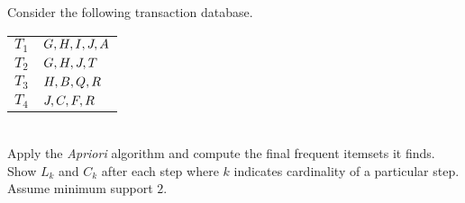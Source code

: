 



\question Consider the following transaction database.
\\
\begin{tabular}{ll}
  \textbf{$T_1$} & $G,H,I,J,A$ \nonumber \\
  \textbf{$T_2$} & $G,H,J,T$ \nonumber \\
  \textbf{$T_3$} & $H,B,Q,R$ \nonumber \\
  \textbf{$T_4$} & $J,C,F,R$ \nonumber
\end{tabular}
\\
Apply the \textit{Apriori} algorithm and compute the final frequent
itemsets it finds. Show $L_k$ and $C_k$ after each step where $k$ 
indicates cardinality of a particular step. Assume minimum support $2$.

\watchout

